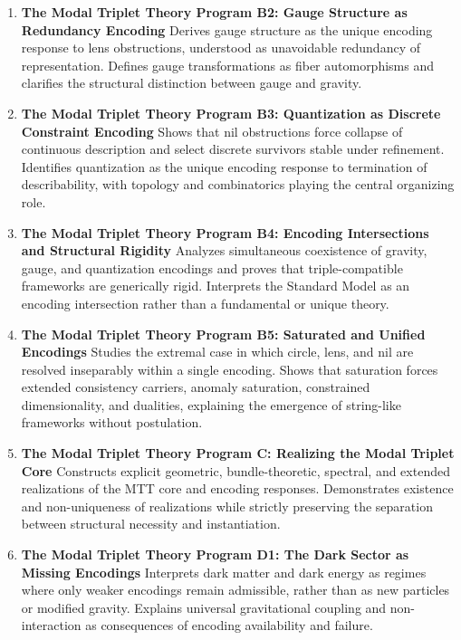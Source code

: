 \documentclass[11pt]{article}
\begin{document}
\begin{enumerate}[leftmargin=*]
\item \textbf{The Modal Triplet Theory Program B2: Gauge Structure as Redundancy Encoding}  
Derives gauge structure as the unique encoding response to lens obstructions, understood as unavoidable redundancy of representation. Defines gauge transformations as fiber automorphisms and clarifies the structural distinction between gauge and gravity.

\item \textbf{The Modal Triplet Theory Program B3: Quantization as Discrete Constraint Encoding}  
Shows that nil obstructions force collapse of continuous description and select discrete survivors stable under refinement. Identifies quantization as the unique encoding response to termination of describability, with topology and combinatorics playing the central organizing role.

\item \textbf{The Modal Triplet Theory Program B4: Encoding Intersections and Structural Rigidity}  
Analyzes simultaneous coexistence of gravity, gauge, and quantization encodings and proves that triple-compatible frameworks are generically rigid. Interprets the Standard Model as an encoding intersection rather than a fundamental or unique theory.

\item \textbf{The Modal Triplet Theory Program B5: Saturated and Unified Encodings}  
Studies the extremal case in which circle, lens, and nil are resolved inseparably within a single encoding. Shows that saturation forces extended consistency carriers, anomaly saturation, constrained dimensionality, and dualities, explaining the emergence of string-like frameworks without postulation.

\item \textbf{The Modal Triplet Theory Program C: Realizing the Modal Triplet Core}  
Constructs explicit geometric, bundle-theoretic, spectral, and extended realizations of the MTT core and encoding responses. Demonstrates existence and non-uniqueness of realizations while strictly preserving the separation between structural necessity and instantiation.

\item \textbf{The Modal Triplet Theory Program D1: The Dark Sector as Missing Encodings}  
Interprets dark matter and dark energy as regimes where only weaker encodings remain admissible, rather than as new particles or modified gravity. Explains universal gravitational coupling and non-interaction as consequences of encoding availability and failure.

\end{enumerate}
\end{document}
